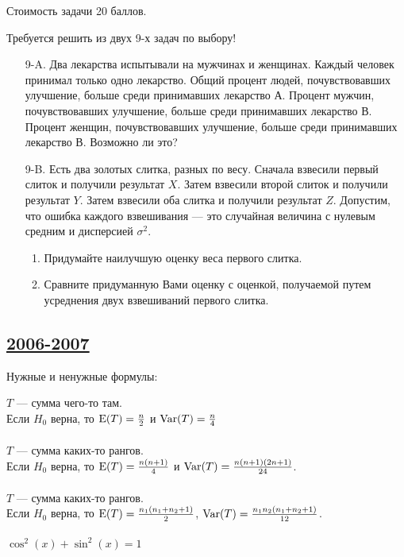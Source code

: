 Стоимость задачи 20 баллов.

Требуется решить \textbf{} из двух 9-х задач по
выбору!

\begin{enumerate}
\item[9-A.] Два лекарства испытывали на мужчинах и женщинах. Каждый
человек принимал только одно лекарство. Общий процент людей,
почувствовавших улучшение, больше среди принимавших лекарство А.
Процент мужчин, почувствовавших улучшение, больше среди принимавших лекарство В. Процент женщин, почувствовавших улучшение, больше среди принимавших лекарство В. Возможно ли это?

\item[9-B.] Есть два золотых слитка, разных по весу. Сначала взвесили первый слиток и получили результат $X$. Затем взвесили второй слиток и получили результат $Y$. Затем взвесили оба слитка и получили результат $Z$. Допустим, что ошибка каждого взвешивания — это случайная величина с нулевым средним и дисперсией $\sigma^{2}$.
\begin{enumerate}
\item Придумайте наилучшую оценку веса первого слитка.
\item Сравните придуманную Вами оценку с оценкой, получаемой путем усреднения двух взвешиваний первого слитка.
\end{enumerate}
\end{enumerate}


\subsection[2006-2007]{\hyperref[sec:sol_kr_03_2006_2007]{2006-2007}}
\label{sec:kr_03_2006_2007}

Нужные и ненужные формулы:


$T$ — сумма чего-то там. \\
Если $H_{0}$ верна, то $\operatorname{E}(T)=\frac{n}{2}$ и $\operatorname{Var}(T)=\frac{n}{4}$ \\ \\
$T$ — сумма каких-то рангов. \\
Если $H_{0}$ верна, то $\operatorname{E}(T)=\frac{n(n+1)}{4}$ и
$\operatorname{Var}(T)=\frac{n(n+1)(2n+1)}{24}$. \\ \\
$T$ — сумма каких-то рангов. \\
Если $H_{0}$ верна, то $\operatorname{E}(T)=\frac{n_{1}(n_{1}+n_{2}+1)}{2}$,
$\operatorname{Var}(T)=\frac{n_{1}n_{2}(n_{1}+n_{2}+1)}{12}$. \\ \\
$\cos^{2}(x)+\sin^{2}(x)=1$ \\

